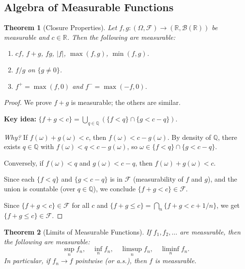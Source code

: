 \documentclass[11pt,a4paper]{article}
\theoremstyle{definition}
\theoremstyle{plain}
\newtheorem{theorem}{Theorem}[section]
\theoremstyle{remark}
\newcommand{\R}{\mathbb{R}}
\newcommand{\Q}{\mathbb{Q}}
\newcommand{\Borel}{\mathcal{B}}
\begin{document}
\subsection{Algebra of Measurable Functions}
\label{subsec:meas_algebra}

\begin{theorem}[Closure Properties]
\label{thm:meas_closure}
Let $f, g: (\Omega, \mathcal{F}) \to (\R, \Borel(\R))$ be measurable and $c \in \R$.
Then the following are measurable:
\begin{enumerate}[nosep,label=(\alph*)]
    \item $cf$, \quad $f + g$, \quad $fg$, \quad $|f|$, \quad $\max(f, g)$, \quad $\min(f, g)$.
    \item $f/g$ on $\{g \neq 0\}$.
    \item $f^+ = \max(f, 0)$ and $f^- = \max(-f, 0)$.
\end{enumerate}
\end{theorem}

\begin{proof}
We prove $f + g$ is measurable; the others are similar.

\textbf{Key idea:} $\{f + g < c\} = \bigcup_{q \in \Q} (\{f < q\} \cap \{g < c - q\})$.

\textit{Why?} If $f(\omega) + g(\omega) < c$, then $f(\omega) < c - g(\omega)$. By density of $\Q$, there exists $q \in \Q$ with $f(\omega) < q < c - g(\omega)$, so $\omega \in \{f < q\} \cap \{g < c - q\}$.

Conversely, if $f(\omega) < q$ and $g(\omega) < c - q$, then $f(\omega) + g(\omega) < c$.

Since each $\{f < q\}$ and $\{g < c - q\}$ is in $\mathcal{F}$ (measurability of $f$ and $g$), and the union is countable (over $q \in \Q$), we conclude $\{f + g < c\} \in \mathcal{F}$.

Since $\{f + g < c\} \in \mathcal{F}$ for all $c$ and $\{f + g \leq c\} = \bigcap_{n} \{f + g < c + 1/n\}$, we get $\{f + g \leq c\} \in \mathcal{F}$.
\end{proof}

\begin{theorem}[Limits of Measurable Functions]
\label{thm:meas_limits}
If $f_1, f_2, \ldots$ are measurable, then the following are measurable:
\begin{equation}
    \sup_n f_n, \quad \inf_n f_n, \quad \limsup_n f_n, \quad \liminf_n f_n.
\end{equation}
In particular, if $f_n \to f$ pointwise (or a.s.), then $f$ is measurable.
\end{theorem}
\end{document}
